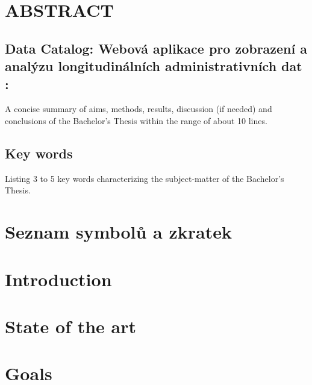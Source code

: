 \documentclass[a4paper,12pt]{article}   %
\numberwithin{equation}{section}        %
\newcommand{\nazevENG}{Data Catalog: Webová aplikace pro zobrazení a analýzu longitudinálních administrativních dat }
\begin{document}
		
	\null\vfill	
	\section*{ABSTRACT}
        \subsection*{\nazevENG:}
		 
        A concise summary of aims, methods, results, discussion (if needed) and conclusions of the Bachelor’s Thesis within the range of about 10 lines.
    
	\subsection*{Key words}
		Listing 3 to 5 key words characterizing the subject-matter of the Bachelor's Thesis.
	\clearpage
	
    \pagestyle{plain}	%
	
	\tableofcontents			%

	\clearpage

	\section*{Seznam symbolů a zkratek} %
	
	\clearpage
		
	
		
	
	
	
	\section{Introduction}
	
	\clearpage
	
	\section{State of the art}
	
	\clearpage
	
    \section{Goals}
	
	\clearpage
	
\end{document}
